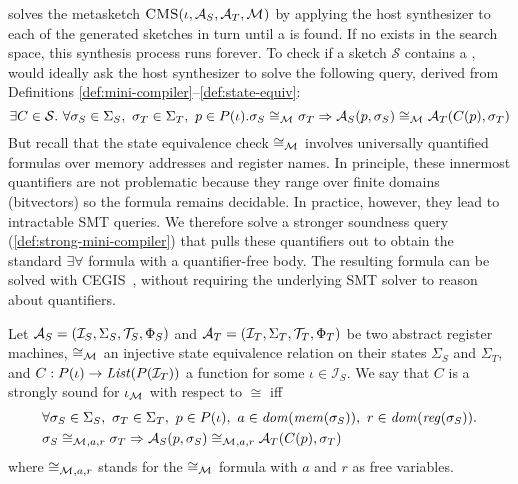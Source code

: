 \jitsynth solves the metasketch $\CMS(\iota, \arm_S, \arm_T, \Map)$ by applying
the host synthesizer to each of the generated sketches in turn until a
\minicompiler is found. If no \minicompiler exists in the search space, this
synthesis process runs forever. To check if a sketch $\mathcal{S}$ contains a
\minicompiler, \jitsynth would ideally ask the host synthesizer to solve the
following query, derived from Definitions \ref{def:mini-compiler}--\ref{def:state-equiv}: 
{\small
\[
    \exists C\in\mathcal{S} . \ 
    \forall \sigma_S\in\Sigma_S,\ \sigma_T\in\Sigma_T,\ p\in\prog{\iota}. \\ 
      \sigma_S \cong_{\Map} \sigma_T \Rightarrow
      \arm_S(p, \sigma_S) \cong_{\Map} \arm_T(C(p), \sigma_T)
\]}%
But recall that the state equivalence check $\cong_{\mathcal{M}_{}}$ involves universally
quantified formulas over memory addresses and register names. In principle,
these innermost quantifiers are not problematic because they range over finite
domains (bitvectors) so the formula remains decidable. In practice, however,
they lead to intractable SMT queries. We therefore solve a stronger soundness
query (\autoref{def:strong-mini-compiler}) that pulls these quantifiers out to
obtain the standard $\exists\forall$ formula with a quantifier-free body. The  
resulting formula can be solved with CEGIS~\cite{solar-lezama:sketch}, without 
requiring the underlying SMT solver to reason about quantifiers.

\begin{definition}\label{def:strong-mini-compiler}
  Let $\mathcal{A}_S = (\mathcal{I}_S, \Sigma_S, \mathcal{T}_S, \Phi_S)$ and $\mathcal{A}_T =
  (\mathcal{I}_T, \Sigma_T, \mathcal{T}_T, \Phi_T)$ be two abstract register
  machines, $\cong_{\mathcal{M}_{}}$ an injective state equivalence relation on their
  states $\Sigma_S$ and $\Sigma_T$, and $C: P(\iota) \rightarrow
  \mathit{List}(P(\mathcal{I}_T))$ a function for some
  $\iota\in\mathcal{I}_S$. We say that $C$ is a \textup{strongly sound
  \minicompiler} for $\iota_{\mathcal{M}_{}}$ with respect to $\cong$ iff
  \begin{align*}\small
    & \forall \sigma_S\in\Sigma_S,\ \sigma_T\in\Sigma_T,\ p\in\prog{\iota}, \
    a\in\mathid{dom}(\mem(\sigma_S)),\ r\in\mathid{dom}(\regs(\sigma_S)). \\ 
    & \sigma_S \cong_{\Map,a,r} \sigma_T \Rightarrow
       \arm_S(p, \sigma_S) \cong_{\Map,a,r} \arm_T(C(p), \sigma_T)
\end{align*}
where $\cong_{\mathcal{M}_{},a,r}$ stands for the $\cong_{\mathcal{M}_{}}$ formula with $a$ and $r$
as free variables. 
  \end{definition} 

